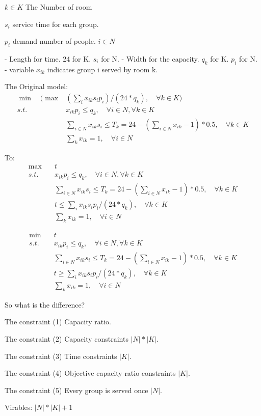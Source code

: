 $k\in K$  The Number of room

$s_i$ service time for each group.

$p_i$ demand number of people.  $i \in N$

- Length for time.          24 for K. $s_i$ for N.
- Width for the capacity.   $q_k$ for K. $p_i$  for N.
- variable $x_{ik}$ indicates group i served by room k.

The Original model:
$$
\begin{aligned}
\min \quad (\max & (\sum_i {x_{ik} s_i p_i})/(24 * q_k ),\quad \forall k \in K) \\
s.t. \quad  & x_{ik} p_i \leq q_k,\quad  \forall i \in N, \forall k \in K  \\
& \sum_{i\in N} x_{ik} s_i \leq T_k = 24 - (\sum_{i\in N} x_{ik} - 1)*0.5,\quad \forall k \in K \\
& \sum_{k} x_{ik} =1,\quad \forall i \in N
\end{aligned}$$

To:
$$
\begin{aligned}
\max \quad & t \\
s.t. \quad  & x_{ik} p_i \leq q_k, \quad \forall i \in N,  \forall k \in K  \\
& \sum_{i\in N} x_{ik} s_i \leq T_k = 24 - (\sum_{i\in N} x_{ik} - 1)*0.5,\quad\forall k \in K \\
& t \leq \sum_i{x_{ik} s_i p_i}/(24 * q_k),\quad  \forall k \in K \\
& \sum_{k} x_{ik} =1,\quad \forall i \in N
\end{aligned}$$

$$
\begin{aligned}
\min \quad & t \\
s.t. \quad  & x_{ik} p_i \leq q_k, \quad \forall i \in N,  \forall k \in K  \\
& \sum_{i\in N} x_{ik} s_i \leq T_k = 24 - (\sum_{i\in N} x_{ik} - 1)*0.5,\quad\forall k \in K \\
& t \geq \sum_i{x_{ik} s_i p_i}/(24 * q_k),\quad  \forall k \in K \\
& \sum_{k} x_{ik} =1,\quad \forall i \in N
\end{aligned}$$

So what is the difference?

The constraint (1) Capacity ratio.

The constraint (2) Capacity constraints $|N|*|K|$.

The constraint (3) Time constraints $|K|$.

The constraint (4) Objective capacity ratio constraints $|K|$.

The constraint (5) Every group is served once $|N|$.

Virables: $|N|*|K|+1$